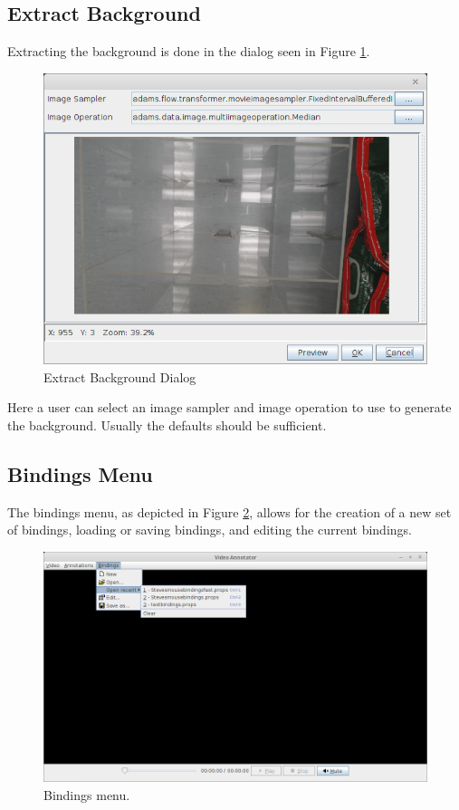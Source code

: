 \documentclass[a4paper]{book}
\begin{document}
\subsection{Extract Background}
Extracting the background is done in the dialog seen in Figure \ref{AnnotatorExtractBackground}.

\begin{figure}[htb]
  \centering
  \includegraphics[width=12.0cm]{images/AnnotatorExtractBackground.png}
  \caption{Extract Background Dialog}
  \label{AnnotatorExtractBackground}
\end{figure}

Here a user can select an image sampler and image operation to use to generate the background. Usually the defaults
should be sufficient.

\subsection{Bindings Menu}
The bindings menu, as depicted in Figure \ref{AnnotatorBindingsMenu}, allows
for the creation of a new set of bindings, loading or saving bindings, and
editing the current bindings.

\begin{figure}[htb]
  \centering
  \includegraphics[width=12.0cm]{images/AnnotatorBindingsMenu.png}
  \caption{Bindings menu.}
  \label{AnnotatorBindingsMenu}
\end{figure}
\end{document}
